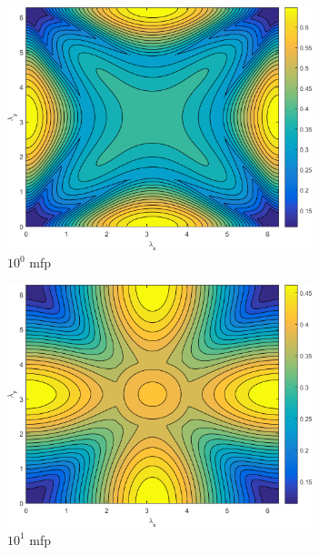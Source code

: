 \begin{figure}
	{
	\begin{subfigure}[b]{0.485\textwidth}
		\centering
		\includegraphics[width=0.975\textwidth]{figures/appendices/SI_M4S_UPWLD1_LS2_x=1_dydx=1_contour.png}
		\caption{$10^{0}$ mfp}
	\end{subfigure}
	\hfill
	\begin{subfigure}[b]{0.485\textwidth}
		\centering
		\includegraphics[width=0.975\textwidth]{figures/appendices/SI_M4S_UPWLD1_LS2_x=10_dydx=1_contour.png}
		\caption{$10^{1}$ mfp}
	\end{subfigure}
	}
	\vspace{0.5cm}
	{
	\begin{subfigure}[b]{0.485\textwidth}

\end{subfigure}}
\end{figure}

